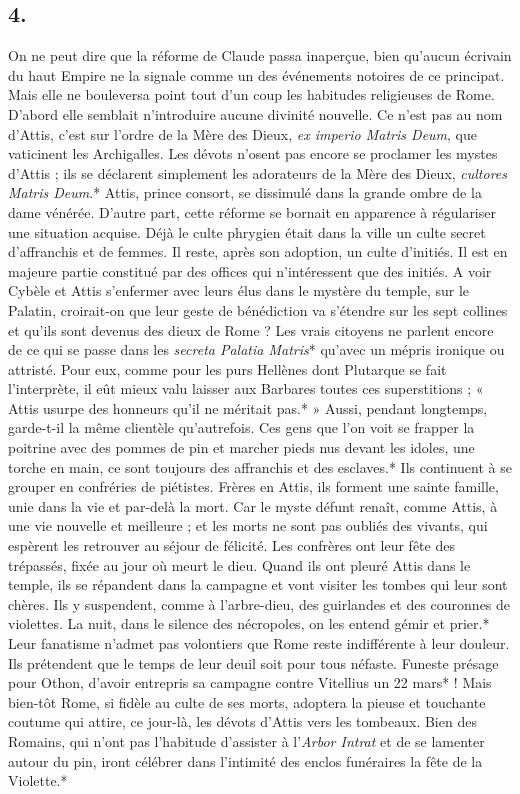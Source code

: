 \documentclass[a4paper, 11pt, oneside, polutonikogreek, french]{article}
\begin{document}
\subsection{4.}

On ne peut dire que la réforme de Claude passa inaperçue, bien qu'aucun écrivain du haut Empire ne la signale comme un des événements notoires de ce principat. Mais elle ne bouleversa point tout d'un coup les habitudes religieuses de Rome. D'abord elle semblait n'introduire aucune divinité nouvelle. Ce n'est pas au nom d'Attis, c'est sur l'ordre de la Mère des Dieux, \emph{ex imperio Matris Deum}, que vaticinent les Archigalles. Les dévots n'osent pas encore se proclamer les mystes d'Attis ; ils se déclarent simplement les adorateurs de la Mère des Dieux, \emph{cultores Matris Deum}.* Attis, prince consort, se dissimulé dans la grande ombre de la dame vénérée. D'autre part, cette réforme se bornait en apparence à régulariser une situation acquise. Déjà le culte phrygien était dans la ville un culte secret d'affranchis et de femmes. Il reste, après son adoption, un culte d'initiés. Il est en majeure partie constitué par des offices qui n'intéressent que des initiés. A voir Cybèle et Attis s'enfermer avec leurs élus dans le mystère du temple, sur le Palatin, croirait-on que leur geste de bénédiction va s'étendre sur les sept collines et qu'ils sont devenus des dieux de Rome ? Les vrais citoyens ne parlent encore de ce qui se passe dans les \emph{secreta Palatia Matris}* qu'avec un mépris ironique ou attristé. Pour eux, comme pour les purs Hellènes dont Plutarque se fait l'interprète, il eût mieux valu laisser aux Barbares toutes ces superstitions ; « Attis usurpe des honneurs qu'il ne méritait pas.* » Aussi, pendant longtemps, garde-t-il la même clientèle qu'autrefois. Ces gens que l'on voit se frapper la poitrine avec des pommes de pin et marcher pieds nus devant les idoles, une torche en main, ce sont toujours des affranchis et des esclaves.* Ils continuent à se grouper en confréries de piétistes. Frères en Attis, ils forment une sainte famille, unie dans la vie et par-delà la mort. Car le myste défunt renaît, comme Attis, à une vie nouvelle et meilleure ; et les morts ne sont pas oubliés des vivants, qui espèrent les retrouver au séjour de félicité. Les confrères ont leur fête des trépassés, fixée au jour où meurt le dieu. Quand ils ont pleuré Attis dans le temple, ils se répandent dans la campagne et vont visiter les tombes qui leur sont chères. Ils y suspendent, comme à l'arbre-dieu, des guirlandes et des couronnes de violettes. La nuit, dans le silence des nécropoles, on les entend gémir et prier.* Leur fanatisme n'admet pas volontiers que Rome reste indifférente à leur douleur. Ils prétendent que le temps de leur deuil soit pour tous néfaste. Funeste présage pour Othon, d'avoir entrepris sa campagne contre Vitellius un 22 mars* ! Mais bien-tôt Rome, si fidèle au culte de ses morts, adoptera la pieuse et touchante coutume qui attire, ce jour-là, les dévots d'Attis vers les tombeaux. Bien des Romains, qui n'ont pas l'habitude d'assister à l'\emph{Arbor Intrat} et de se lamenter autour du pin, iront célébrer dans l'intimité des enclos funéraires la fête de la Violette.*
\end{document}
